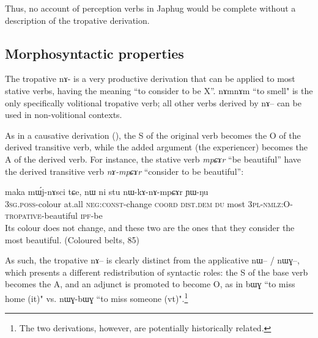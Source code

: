 \documentclass[oldfontcommands,oneside,a4paper,11pt]{article}
\newcommand{\ipa}[1]{{\phon #1}} %
\newcommand{\coord}{\textsc{coord}}
\newcommand{\const}{\textsc{const}}
\newcommand{\dem}{\textsc{dem}}
\newcommand{\distal}{\textsc{dist}}
\newcommand{\du}{\textsc{du}}
\newcommand{\ipf}{\textsc{ipf}}
\newcommand{\negat}{\textsc{neg}}
\newcommand{\nmlz}{\textsc{nmlz}}
\newcommand{\pl}{\textsc{pl}}
\newcommand{\poss}{\textsc{poss}}
\newcommand{\sg}{\textsc{sg}}
\begin{document}
Thus, no account of perception verbs in Japhug would be complete without a description of the tropative derivation.
\subsection{Morphosyntactic properties}
The tropative \ipa{nɤ-}  is a very productive derivation that can be applied to most stative verbs, having the meaning ``to consider to be X''. \ipa{nɤmnɤm} ``to smell" is the only specifically volitional tropative verb; all other verbs derived by \ipa{nɤ}-- can be used in non-volitional contexts.

As in a causative derivation (\citealt[45]{dixon00causative}), the S of the original verb becomes the O of the derived transitive verb, while the added argument (the experiencer) becomes the A of the derived verb. For instance, the stative verb  \textit{mpɕɤr} ``be beautiful'' have the derived transitive verb \textit{nɤ-mpɕɤr} ``consider to be beautiful'':


 \begin{exe}
\ex
\gll  \ipa{ɯ-mdoʁ} 	\ipa{maka} 	\ipa{mɯ́j-nɤsci} 	\ipa{tɕe,} 	\ipa{nɯ} 	\ipa{ni} 	\ipa{stu} 	\ipa{nɯ-kɤ-nɤ-mpɕɤr} 	\ipa{ɲɯ-ŋu} 
\\
3\sg{}.\poss{}-colour at.all \negat{}:\const{}-change \coord{} \distal{}.\dem{} \du{} most 3\pl{}-\nmlz{}:O-\textsc{tropative}-beautiful \ipf{}-be \\
 \glt  Its colour does not change, and these two are the ones that they consider the most beautiful. (Coloured belts, 85)
\end{exe} 

As such, the tropative \ipa{nɤ}-- is clearly  distinct from the applicative \ipa{nɯ}-- / \ipa{nɯɣ}--, which presents a different redistribution of syntactic roles: the S of the base verb becomes the A, and an adjunct is promoted to become O, as in \ipa{bɯɣ} ``to miss home (it)" vs. \ipa{nɯɣ-bɯɣ} ``to miss someone (vt)".\footnote{The two derivations, however, are potentially historically related.}
\end{document}
